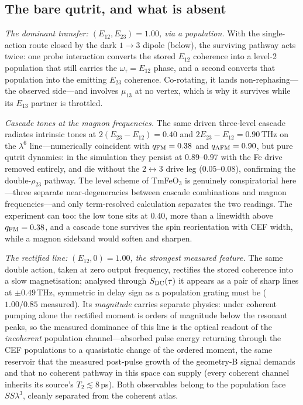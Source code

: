 \documentclass[aps,prb,twocolumn,superscriptaddress,longbibliography]{revtex4-2}
\newcommand{\qafm}{q_{\rm AFM}}
\newcommand{\qfm}{q_{\rm FM}}
\begin{document}
\subsection{The bare qutrit, and what is absent}

\emph{The dominant transfer: $(E_{12},E_{23})=1.00$, via a
population.}  With the single-action route closed by the dark
$1\!\to\!3$ dipole (below), the surviving pathway acts twice: one
probe interaction converts the stored $E_{12}$ coherence into a
level-2 population that still carries the $\omega_\tau=E_{12}$ phase,
and a second converts that population into the emitting $E_{23}$
coherence.  Co-rotating, it lands non-rephasing---the observed
side---and involves $\mu_{13}$ at no vertex, which is why it survives
while its $E_{13}$ partner is throttled.

\emph{Cascade tones at the magnon frequencies.}  The same driven
three-level cascade radiates intrinsic tones at
$2(E_{23}{-}E_{12})=0.40$ and $2E_{23}{-}E_{12}=0.90$\,THz on the
$\lambda^6$ line---numerically coincident with $\qfm=0.38$ and
$\qafm=0.90$, but pure qutrit dynamics: in the simulation they
persist at $0.89$--$0.97$ with the Fe drive removed entirely, and die
without the $2\!\leftrightarrow\!3$ drive leg ($0.05$--$0.08$),
confirming the double-$\rho_{23}$ pathway.  The level scheme of
TmFeO$_3$ is genuinely conspiratorial here---three separate
near-degeneracies between cascade combinations and magnon
frequencies---and only term-resolved calculation separates the two
readings.  The experiment can too: the low tone sits at $0.40$, more
than a linewidth above $\qfm=0.38$, and a cascade tone survives the
spin reorientation with CEF width, while a magnon sideband would
soften and sharpen.

\emph{The rectified line: $(E_{12},0)=1.00$, the strongest measured
feature.}  The same double action, taken at zero output frequency,
rectifies the stored coherence into a slow magnetisation; analysed
through $S_{\rm DC}(\tau)$ it appears as a pair of sharp lines at
$\pm0.49$\,THz, symmetric in delay sign as a population grating must
be ($1.00/0.85$ measured).  Its \emph{magnitude} carries separate
physics: under coherent pumping alone the rectified moment is orders
of magnitude below the resonant peaks, so the measured dominance of
this line is the optical readout of the \emph{incoherent} population
channel---absorbed pulse energy returning through the CEF populations
to a quasistatic change of the ordered moment, the same reservoir
that the measured post-pulse growth of the geometry-B signal demands
and that no coherent pathway in this space can supply (every coherent
channel inherits its source's $T_2\lesssim8$\,ps).  Both observables
belong to the population face $SS\lambda^3$, cleanly separated from
the coherent atlas.
\end{document}

